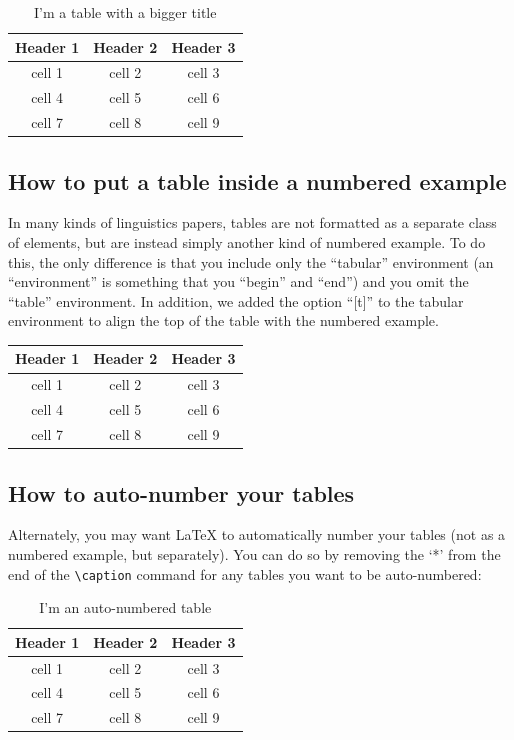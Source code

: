 \documentclass{article}
\begin{document}
\begin{table}[h!] 
\caption*{\large{I'm a table with a bigger title}}
\centering
\begin{tabular}{|c|c|c|}
\hline
\textbf{Header 1} & \textbf{Header 2} & \textbf{Header 3} \\
\hline\hline
cell 1 & cell 2 & cell 3 \\
\hline
cell 4 & cell 5 & cell 6 \\
\hline
cell 7 & cell 8 & cell 9 \\
\hline
\end{tabular}
\end{table}

\subsection{How to put a table inside a numbered example}

In many kinds of linguistics papers, tables are not formatted as a separate class of elements, but are instead simply another kind of numbered example. To do this, the only difference is that you include only the ``tabular'' environment (an ``environment'' is something that you ``begin'' and ``end'') and you omit the ``table'' environment. In addition, we added the option ``[t]'' to the tabular environment to align the top of the table with the numbered example.

\ea 

\begin{tabular}[t]{|c|c|c|} %
\hline
\textbf{Header 1} & \textbf{Header 2} & \textbf{Header 3} \\
\hline\hline
cell 1 & cell 2 & cell 3 \\
\hline
cell 4 & cell 5 & cell 6 \\
\hline
cell 7 & cell 8 & cell 9 \\
\hline
\end{tabular}

\z 

\subsection{How to auto-number your tables}
Alternately, you may want \LaTeX{} to automatically number your tables (not as a numbered example, but separately). You can do so by removing the `*' from the end of the \verb|\caption| command for any tables you want to be auto-numbered:

\begin{table}[h!] 
\caption{I'm an auto-numbered table} 
\centering
\begin{tabular}{|c|c|c|}
\hline
\textbf{Header 1} & \textbf{Header 2} & \textbf{Header 3} \\
\hline\hline
cell 1 & cell 2 & cell 3 \\
\hline
cell 4 & cell 5 & cell 6 \\
\hline
cell 7 & cell 8 & cell 9 \\
\hline
\end{tabular}
\end{table}
\end{document}
